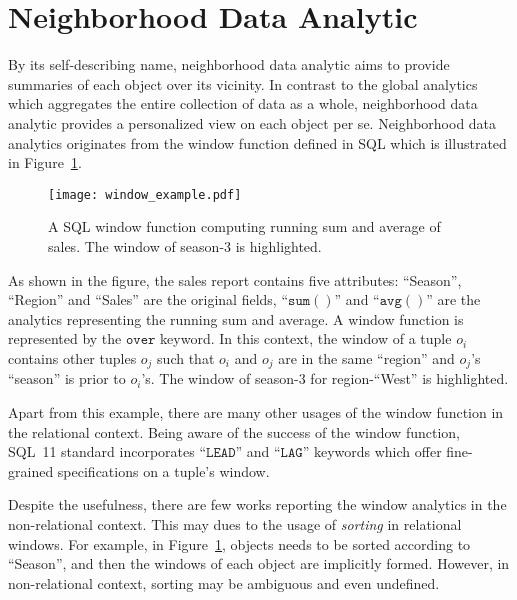 \section{Neighborhood Data Analytic}
By its self-describing name, neighborhood data analytic aims to provide
summaries of each object over its vicinity. In contrast to the global
analytics which aggregates the entire collection of data as a whole, neighborhood
data analytic provides a personalized view on each object per se. Neighborhood
data analytics originates from the window function defined in  SQL which is
illustrated in Figure~\ref{fig:window}.

\begin{figure}[h]
\centering
\texttt{[image: window\_example.pdf]}
\caption{A SQL window function computing running sum and average of
sales. The window of season-3 is highlighted.} 
\label{fig:window}
\end{figure}

As shown in the figure, the sales report contains five attributes: 
``Season'', ``Region'' and ``Sales'' are the original fields, ``$\mathtt{sum()}$'' and ``$\mathtt{avg()}$''
are the analytics representing the running sum and average. A window function
is represented by the $\mathtt{over}$ keyword. In this context, the window of a tuple $o_i$
contains other tuples $o_j$ such that $o_i$ and $o_j$ are in the same ``region'' and $o_j$'s ``season'' is
prior to $o_i$'s. The window of season-$3$ for region-``West'' is highlighted.

Apart from this example, there are many other 
usages of the window function in the relational context. 
Being aware of the success of the window function, 
SQL~11 standard incorporates ``$\mathtt{LEAD}$'' and ``$\mathtt{LAG}$'' 
keywords which offer fine-grained specifications on a tuple's window.

Despite the usefulness, there are few works reporting the window
analytics in the non-relational context. This may dues to the
usage of \emph{sorting} in relational windows. For example,
in Figure~\ref{fig:window},
objects needs to be sorted according to ``Season'', and then the windows of
each object are implicitly formed. However, 
in non-relational context, sorting may be ambiguous and even undefined.

